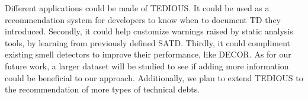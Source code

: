 Different applications could be made of \ac{TEDIOUS}. It could be used as a recommendation system for developers to know when to document \ac{TD} they introduced. Secondly, it could help customize warnings raised by static analysis tools, by learning from previously defined \ac{SATD}. Thirdly, it could compliment existing smell detectors to improve their performance, like \ac{DECOR}. As for our future work, a larger dataset will be studied to see if adding more information could be beneficial to our approach. Additionally, we plan to extend \ac{TEDIOUS} to the recommendation of more types of technical debts.




